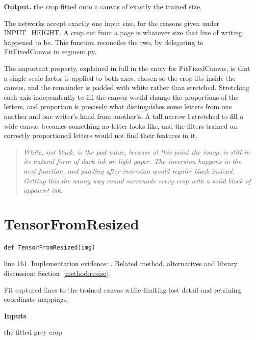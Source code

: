\noindent\textbf{Output.} the crop fitted onto a canvas of exactly the trained size.


The networks accept exactly one input size, for the reasons given under INPUT\_HEIGHT. A crop cut from a page is whatever size that line of writing happened to be. This function reconciles the two, by delegating to FitFixedCanvas in segment.py.


The important property, explained in full in the entry for FitFixedCanvas, is that a single scale factor is applied to both axes, chosen so the crop fits inside the canvas, and the remainder is padded with white rather than stretched. Stretching each axis independently to fill the canvas would change the proportions of the letters, and proportion is precisely what distinguishes some letters from one another and one writer's hand from another's. A tall narrow l stretched to fill a wide canvas becomes something no letter looks like, and the filters trained on correctly proportioned letters would not find their features in it.


\begin{quote}\small\itshape White, not black, is the pad value, because at this point the image is still in its natural form of dark ink on light paper. The inversion happens in the next function, and padding after inversion would require black instead. Getting this the wrong way round surrounds every crop with a solid block of apparent ink.\end{quote}


\section{TensorFromResized}\label{fn:recognise:TensorFromResized}
\begin{lstlisting}[style=sig]
def TensorFromResized(img)
\end{lstlisting}
 line 161. Implementation evidence: \cite{code2026}. Related method, alternatives and library discussion: Section~\ref{method:resize}.


Fit captured lines to the trained canvas while limiting lost detail and retaining coordinate mappings.




\noindent\textbf{Inputs}
\begin{description}[leftmargin=2.2em,style=nextline,font=\normalfont\ttfamily]\setlength\itemsep{1pt}
  \item[{img}] \normalfont the fitted grey crop
\end{description}

